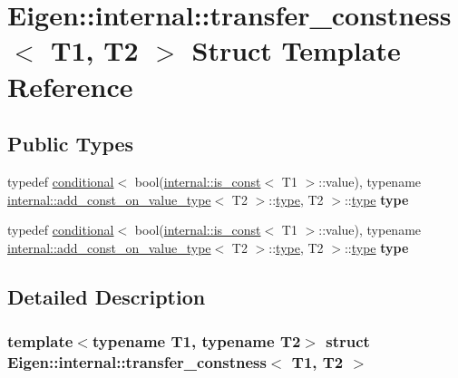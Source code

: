 \hypertarget{struct_eigen_1_1internal_1_1transfer__constness}{}\section{Eigen\+:\+:internal\+:\+:transfer\+\_\+constness$<$ T1, T2 $>$ Struct Template Reference}
\label{struct_eigen_1_1internal_1_1transfer__constness}
\subsection*{Public Types}
\begin{DoxyCompactItemize}
\item 
\mbox{\label{struct_eigen_1_1internal_1_1transfer__constness_a0eeedf663ff71e7a42e3ea726927afc0}} 
typedef \hyperlink{struct_eigen_1_1internal_1_1conditional}{conditional}$<$ bool(\hyperlink{struct_eigen_1_1internal_1_1is__const}{internal\+::is\+\_\+const}$<$ T1 $>$\+::value), typename \hyperlink{struct_eigen_1_1internal_1_1add__const__on__value__type}{internal\+::add\+\_\+const\+\_\+on\+\_\+value\+\_\+type}$<$ T2 $>$\+::\hyperlink{class_eigen_1_1internal_1_1_tensor_lazy_evaluator_writable}{type}, T2 $>$\+::\hyperlink{class_eigen_1_1internal_1_1_tensor_lazy_evaluator_writable}{type} {\bfseries type}
\item 
\mbox{\label{struct_eigen_1_1internal_1_1transfer__constness_a0eeedf663ff71e7a42e3ea726927afc0}} 
typedef \hyperlink{struct_eigen_1_1internal_1_1conditional}{conditional}$<$ bool(\hyperlink{struct_eigen_1_1internal_1_1is__const}{internal\+::is\+\_\+const}$<$ T1 $>$\+::value), typename \hyperlink{struct_eigen_1_1internal_1_1add__const__on__value__type}{internal\+::add\+\_\+const\+\_\+on\+\_\+value\+\_\+type}$<$ T2 $>$\+::\hyperlink{class_eigen_1_1internal_1_1_tensor_lazy_evaluator_writable}{type}, T2 $>$\+::\hyperlink{class_eigen_1_1internal_1_1_tensor_lazy_evaluator_writable}{type} {\bfseries type}
\end{DoxyCompactItemize}


\subsection{Detailed Description}
\subsubsection*{template$<$typename T1, typename T2$>$\newline
struct Eigen\+::internal\+::transfer\+\_\+constness$<$ T1, T2 $>$}



